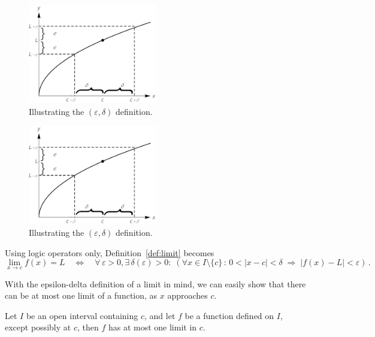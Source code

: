 \ifvc
\begin{figure}[H]
	\begin{center}
			\includegraphics[width=0.5\textwidth]{fig_lim_7}
	\caption{Illustrating the $(\varepsilon,\delta)$ definition. }
	\label{fig_lim_7}
	\end{center}
\end{figure}
\fi

\ifcourse
\begin{figure}[H]
	\begin{center}
			\includegraphics[width=0.5\textwidth]{fig_lim_7}
	\caption{Illustrating the $(\varepsilon,\delta)$ definition. }
	\label{fig_lim_7}
	\end{center}
\end{figure}
\fi



\ifcourse
\ifanalysis

Using logic operators only, Definition~\ref{def:limit} becomes
$$\displaystyle \lim_{x\rightarrow c} f(x) = L \quad \Leftrightarrow \quad \forall\,\varepsilon > 0, \exists \, \delta(\varepsilon) > 0  : \; \left(\forall x\in I\setminus\{c\}\,:\,
0<|x - c| < \delta \; \Rightarrow \; |f(x) - L| < \varepsilon\right)\,.$$

With the epsilon-delta definition of a limit in mind, we can easily show that there can be at most one limit of a function, as $x$ approaches $c$.

\begin{theorem}
Let $I$ be an open interval containing $c$, and let $f$ be a function defined on $I$, except possibly at $c$, then $f$ has at most one limit in $c$.
\end{theorem}

